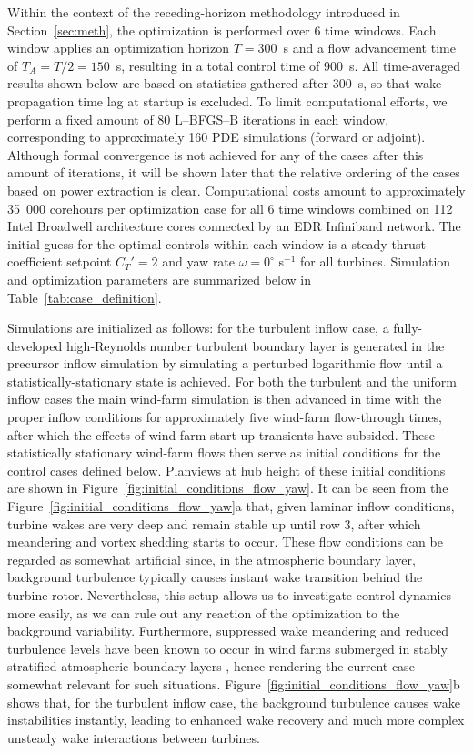 \documentclass[energies,article,submit,moreauthors,latex,10pt,a4paper]{mdpi}
\begin{document}
Within the context of the receding-horizon methodology introduced in Section~\ref{sec:meth}, the optimization is performed over 6 time windows. Each window applies an optimization horizon $T=300$~s and a flow advancement time of $T_A = T/2= 150$~s, resulting in a total control time of 900~s. All time-averaged results shown below are based on statistics gathered after 300~s, so that wake propagation time lag at startup is excluded. To limit computational efforts, we perform a fixed amount of 80 L--BFGS--B iterations in each window, corresponding to approximately 160 PDE simulations (forward or adjoint). Although formal convergence is not achieved for any of the cases after this amount of iterations, it will be shown later that the relative ordering of the cases based on power extraction is clear. Computational costs amount to approximately 35~000 corehours per optimization case for all 6 time windows combined on 112 Intel Broadwell architecture cores connected by an EDR Infiniband network. The initial guess for the optimal controls within each window is a steady thrust coefficient setpoint $C_T'=2$  and yaw rate $\omega = 0^\circ$ s$^{-1}$ for all turbines. Simulation and optimization parameters are summarized below in Table~\ref{tab:case_definition}.

Simulations are initialized as follows: for the turbulent inflow case, a fully-developed high-Reynolds number turbulent boundary layer is generated in the precursor inflow simulation by simulating a perturbed logarithmic flow until a statistically-stationary state is achieved. For both the turbulent and the uniform inflow cases the main wind-farm simulation is then advanced in time with the proper inflow conditions for approximately five wind-farm flow-through times, after which the effects of wind-farm start-up transients have subsided. These statistically stationary wind-farm flows then serve as initial conditions for the control cases defined below. Planviews at hub height of these initial conditions are shown in Figure~\ref{fig:initial_conditions_flow_yaw}. It can be seen from the Figure~\ref{fig:initial_conditions_flow_yaw}a that, given laminar inflow conditions, turbine wakes are very deep and remain stable up until row 3, after which meandering and vortex shedding starts to occur. These flow conditions can be regarded as somewhat artificial since, in the atmospheric boundary layer, background turbulence typically causes instant wake transition behind the turbine rotor. Nevertheless, this setup allows us to investigate control dynamics more easily, as we can rule out any reaction of the optimization to the background variability. Furthermore, suppressed wake meandering and reduced turbulence levels have been known to occur in wind farms submerged in stably stratified atmospheric boundary layers \cite{larsen2009dependence, machefaux2016experimental}, hence rendering the current case somewhat relevant for such situations. Figure~\ref{fig:initial_conditions_flow_yaw}b shows that, for the turbulent inflow case, the background turbulence causes wake instabilities instantly, leading to enhanced wake recovery and much more complex unsteady wake interactions between turbines.
\end{document}
